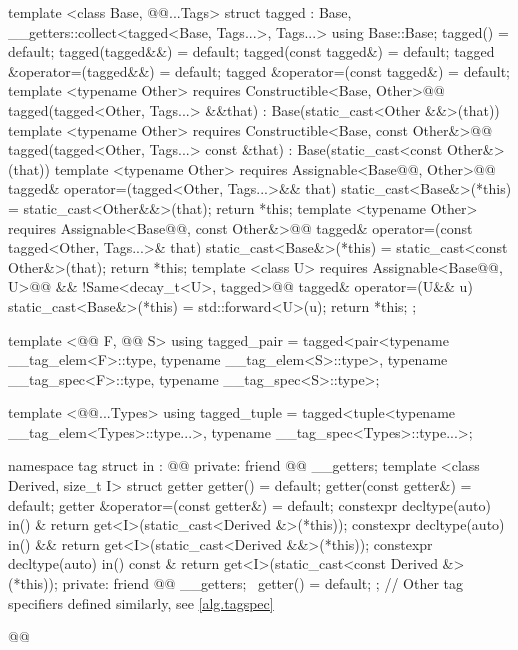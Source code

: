 \begin{codeblock}
{  template <class Base, @@...Tags>
  struct tagged
    : Base, __getters::collect<tagged<Base, Tags...>, Tags...> {
    using Base::Base;
    tagged() = default;
    tagged(tagged&&) = default;
    tagged(const tagged&) = default;
    tagged &operator=(tagged&&) = default;
    tagged &operator=(const tagged&) = default;
    template <typename Other>
      requires Constructible<Base, Other>@\newtxt{()}@
    tagged(tagged<Other, Tags...> &&that)
      : Base(static_cast<Other &&>(that)) { }
    template <typename Other>
      requires Constructible<Base, const Other&>@\newtxt{()}@
    tagged(tagged<Other, Tags...> const &that)
      : Base(static_cast<const Other&>(that)) { }
    template <typename Other>
      requires Assignable<Base@\newtxt{\&}@, Other>@\newtxt{()}@
    tagged& operator=(tagged<Other, Tags...>&& that) {
      static_cast<Base&>(*this) = static_cast<Other&&>(that);
      return *this;
    }
    template <typename Other>
      requires Assignable<Base@\newtxt{\&}@, const Other&>@\newtxt{()}@
    tagged& operator=(const tagged<Other, Tags...>& that) {
      static_cast<Base&>(*this) = static_cast<const Other&>(that);
      return *this;
    }
    template <class U>
      requires Assignable<Base@\newtxt{\&}@, U>@\newtxt{()}@ && !Same<decay_t<U>, tagged>@\newtxt{()}@
    tagged& operator=(U&& u) {
      static_cast<Base&>(*this) = std::forward<U>(u);
      return *this;
    }
  };

  template <@@ F, @@ S>
  using tagged_pair =
    tagged<pair<typename __tag_elem<F>::type, typename __tag_elem<S>::type>,
           typename __tag_spec<F>::type, typename __tag_spec<S>::type>;

  template <@@...Types>
  using tagged_tuple =
    tagged<tuple<typename __tag_elem<Types>::type...>,
           typename __tag_spec<Types>::type...>;

  namespace tag {
    struct in : @@ {
    private:
      friend @@ __getters;
      template <class Derived, size_t I>
      struct getter {
        getter() = default;
        getter(const getter&) = default;
        getter &operator=(const getter&) = default;
        constexpr decltype(auto) in() & {
          return get<I>(static_cast<Derived &>(*this));
        }
        constexpr decltype(auto) in() && {
          return get<I>(static_cast<Derived &&>(*this));
        }
        constexpr decltype(auto) in() const & {
          return get<I>(static_cast<const Derived &>(*this));
        }
      private:
        friend @@ __getters;
        ~getter() = default;
      };
    }
    // Other tag specifiers defined similarly, see \ref{alg.tagspec}
  }
}@\newtxt{\}\}}@
\end{codeblock}

